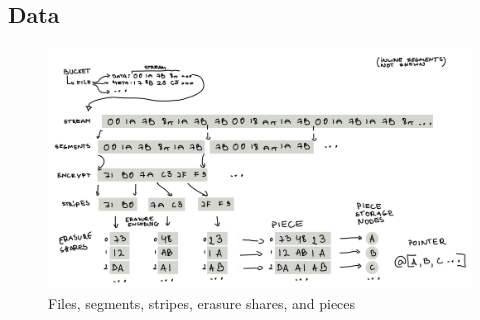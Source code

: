 \documentclass[8pt,fleqn,openany]{book}
\begin{document}
\subsection{Data}

\begin{figure}
\centering
\includegraphics[width=\textwidth]{diagram-drafts/data-flow-diagram.png}
\caption{Files, segments, stripes, erasure shares, and pieces}
\end{figure}
\end{document}
